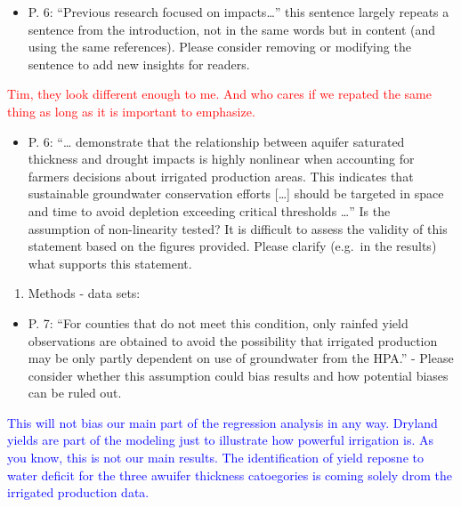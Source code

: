 \documentclass[
]{article}
\providecommand{\tightlist}{%
  \setlength{\itemsep}{0pt}\setlength{\parskip}{0pt}}
\begin{document}
\begin{itemize}
\tightlist
\item
  P. 6: ``Previous research focused on impacts\ldots{}'' this sentence
  largely repeats a sentence from the introduction, not in the same
  words but in content (and using the same references). Please consider
  removing or modifying the sentence to add new insights for readers.
\end{itemize}

\textcolor{red}{Tim, they look different enough to me. And who cares if we repated the same thing as long as it is important to emphasize.}

\begin{itemize}
\tightlist
\item
  P. 6: ``\ldots{} demonstrate that the relationship between aquifer
  saturated thickness and drought impacts is highly nonlinear when
  accounting for farmers decisions about irrigated production areas.
  This indicates that sustainable groundwater conservation efforts
  {[}\ldots{]} should be targeted in space and time to avoid depletion
  exceeding critical thresholds \ldots{}'' Is the assumption of
  non-linearity tested? It is difficult to assess the validity of this
  statement based on the figures provided. Please clarify (e.g.~in the
  results) what supports this statement.
\end{itemize}

\begin{enumerate}
\def\labelenumi{\arabic{enumi}.}
\setcounter{enumi}{5}
\tightlist
\item
  Methods - data sets:
\end{enumerate}

\begin{itemize}
\tightlist
\item
  P. 7: ``For counties that do not meet this condition, only rainfed
  yield observations are obtained to avoid the possibility that
  irrigated production may be only partly dependent on use of
  groundwater from the HPA.'' - Please consider whether this assumption
  could bias results and how potential biases can be ruled out.
\end{itemize}

\textcolor{blue}{
This will not bias our main part of the regression analysis in any way. Dryland yields are part of the modeling just to illustrate how powerful irrigation is. As you know, this is not our main results. The identification of yield reposne to water deficit for the three awuifer thickness catoegories is coming solely drom the irrigated production data.
}
\end{document}
